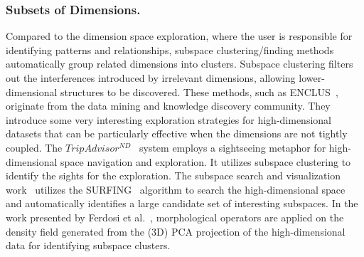 \subsubsection{Subsets of Dimensions.}
Compared to the dimension space exploration, where the user is responsible for identifying patterns and relationships, subspace clustering/finding methods automatically group related dimensions into clusters.
%
Subspace clustering filters out the interferences introduced by irrelevant dimensions, allowing lower-dimensional structures to be discovered.
%
These methods, such as ENCLUS~\cite{ChengFuZhang1999}, originate from the data mining and knowledge discovery community.
%
They introduce some very interesting exploration strategies for high-dimensional datasets that can be particularly effective when the dimensions are not tightly coupled.
%
The $TripAdvisor^{ND}$~\cite{NamMueller2013} system employs a sightseeing metaphor for high-dimensional space navigation and exploration.
%
It utilizes subspace clustering to identify the sights for the exploration.
%
The subspace search and visualization work~\cite{TatuMaabFarber2012} utilizes the SURFING~\cite{BaumgartnerPlantRailing2004} algorithm to search the high-dimensional space and automatically identifies a large candidate set of interesting subspaces.
%
In the work presented by Ferdosi et al.~\cite{FerdosiBuddelmeijerTrager2010}, morphological operators are applied on the density field generated from the (3D) PCA projection of the high-dimensional data for identifying subspace clusters.

